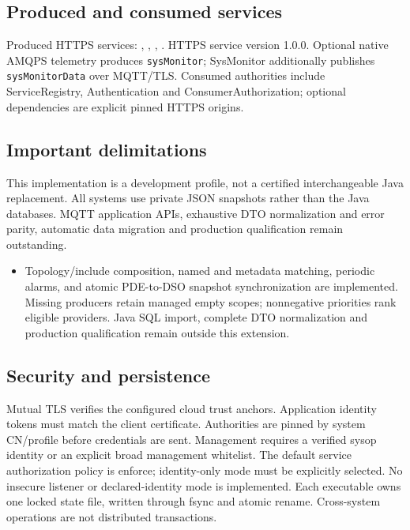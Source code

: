 \documentclass[a4paper]{arrowhead}
\begin{document}
\subsection{Produced and consumed services}
Produced HTTPS services: , \allowbreak {}, \allowbreak {}, \allowbreak {}.
HTTPS service version 1.0.0. Optional native AMQPS telemetry produces \texttt{sysMonitor}; SysMonitor additionally publishes \texttt{sysMonitorData} over MQTT/TLS. Consumed authorities include ServiceRegistry, Authentication and ConsumerAuthorization; optional dependencies are explicit pinned HTTPS origins.
\subsection{Important delimitations}
This implementation is a development profile, not a certified interchangeable Java replacement. All systems use private JSON snapshots rather than the Java databases. MQTT application APIs, exhaustive DTO normalization and error parity, automatic data migration and production qualification remain outstanding.
\begin{itemize}
\item Topology/include composition, named and metadata matching, periodic alarms, and atomic PDE-to-DSO snapshot synchronization are implemented. Missing producers retain managed empty scopes; nonnegative priorities rank eligible providers. Java SQL import, complete DTO normalization and production qualification remain outside this extension.
\end{itemize}
\subsection{Security and persistence}
Mutual TLS verifies the configured cloud trust anchors. Application identity tokens must match the client certificate. Authorities are pinned by system CN/profile before credentials are sent. Management requires a verified sysop identity or an explicit broad management whitelist. The default service authorization policy is enforce; identity-only mode must be explicitly selected. No insecure listener or declared-identity mode is implemented. Each executable owns one locked state file, written through fsync and atomic rename. Cross-system operations are not distributed transactions.
\clearpage
\end{document}
